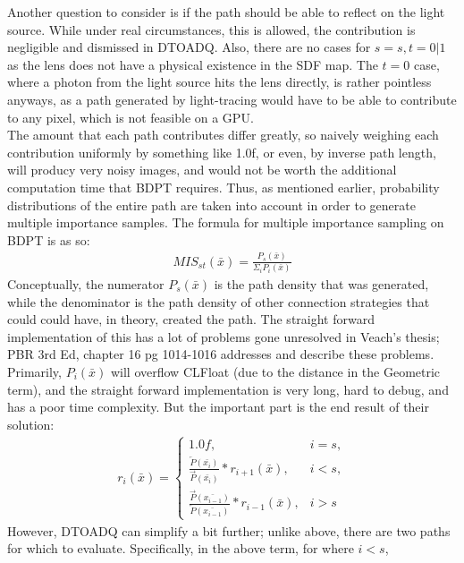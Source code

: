 \documentclass{article}
\begin{document}
    Another question to consider is if the path should be able to reflect on the
light source. While under real circumstances, this is allowed, the contribution
is negligible and dismissed in DTOADQ. Also, there are no cases for $s = s, t =
0|1$ as the lens does not have a physical existence in the SDF map. The $t = 0$
case, where a photon from the light source hits the lens directly, is rather
pointless anyways, as a path generated by light-tracing would have to be able to
contribute to any pixel, which is not feasible on a GPU.
\\

The amount that each path contributes differ greatly, so naively weighing
each contribution uniformly by something like 1.0f, or even, by inverse path
length, will producy very noisy images, and would not be worth the additional
computation time that BDPT requires. Thus, as mentioned earlier, probability
distributions of the entire path are taken into account in order to generate
multiple importance samples.
    The formula for multiple importance sampling on BDPT is as so:
  \begin{align}
    MIS_{st}(\bar{x}) = \frac{P_s(\bar{x})}{\Sigma_i{P_i(\bar{x})}} 
  \end{align}
    Conceptually, the numerator $P_s(\bar{x})$ is the path density that was
generated, while the denominator is the path density of other connection
strategies that could could have, in theory, created the path. The
straight forward implementation of this has a lot of problems gone unresolved in
Veach's thesis; PBR 3rd Ed, chapter 16 pg 1014-1016 addresses and describe these
problems. Primarily, $P_i(\bar{x})$ will overflow CLFloat (due to the distance
in the Geometric term), and the straight forward implementation is very long,
hard to debug, and has a poor time complexity. But the important part is the end
result of their solution:
  \begin{align}
    r_i (\bar{x}) = 
    \begin{cases}
      1.0f, & i = s,\\
      \frac{\overleftarrow{P}(\bar{x_i})}{\overrightarrow{P}(\bar{x_i})} *
      r_{i+1}(\bar{x}), & i < s,\\
      \frac{\overrightarrow{P}(\bar{x_{i-1}})}{\overleftarrow{P}(\bar{x_{i-1}})}
      * r_{i-1}(\bar{x}), & i > s
    \end{cases}
  \end{align}
    However, DTOADQ can simplify a bit further; unlike above, there are two
paths for which to evaluate. Specifically, in the above term, for where $i < s$,
\end{document}
